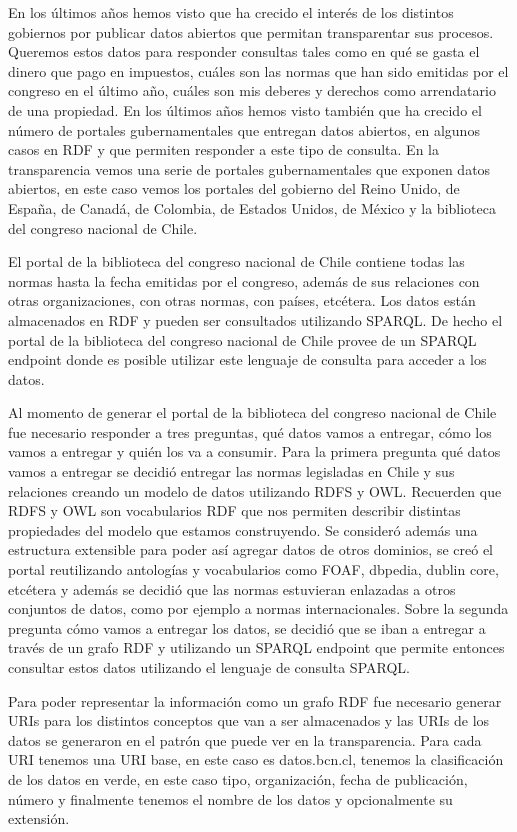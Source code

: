 En los últimos años hemos visto que ha crecido el interés de los distintos gobiernos por publicar datos abiertos que permitan transparentar sus procesos. Queremos estos datos para responder consultas tales como en qué se gasta el dinero que pago en impuestos, cuáles son las normas que han sido emitidas por el congreso en el último año, cuáles son mis deberes y derechos como arrendatario de una propiedad. En los últimos años hemos visto también que ha crecido el número de portales gubernamentales que entregan datos abiertos, en algunos casos en RDF y que permiten responder a este tipo de consulta. En la transparencia vemos una serie de portales gubernamentales que exponen datos abiertos, en este caso vemos los portales del gobierno del Reino Unido, de España, de Canadá, de Colombia, de Estados Unidos, de México y la biblioteca del congreso nacional de Chile.

El portal de la biblioteca del congreso nacional de Chile contiene todas las normas hasta la fecha emitidas por el congreso, además de sus relaciones con otras organizaciones, con otras normas, con países, etcétera. Los datos están almacenados en RDF y pueden ser consultados utilizando SPARQL. De hecho el portal de la biblioteca del congreso nacional de Chile provee de un SPARQL endpoint donde es posible utilizar este lenguaje de consulta para acceder a los datos.

Al momento de generar el portal de la biblioteca del congreso nacional de Chile fue necesario responder a tres preguntas, qué datos vamos a entregar, cómo los vamos a entregar y quién los va a consumir. Para la primera pregunta qué datos vamos a entregar se decidió entregar las normas legisladas en Chile y sus relaciones creando un modelo de datos utilizando RDFS y OWL. Recuerden que RDFS y OWL son vocabularios RDF que nos permiten describir distintas propiedades del modelo que estamos construyendo. Se consideró además una estructura extensible para poder así agregar datos de otros dominios, se creó el portal reutilizando antologías y vocabularios como FOAF, dbpedia, dublin core, etcétera y además se decidió que las normas estuvieran enlazadas a otros conjuntos de datos, como por ejemplo a normas internacionales. Sobre la segunda pregunta cómo vamos a entregar los datos, se decidió que se iban a entregar a través de un grafo RDF y utilizando un SPARQL endpoint que permite entonces consultar estos datos utilizando el lenguaje de consulta SPARQL.

Para poder representar la información como un grafo RDF fue necesario generar URIs para los distintos conceptos que van a ser almacenados y las URIs de los datos se generaron en el patrón que puede ver en la transparencia. Para cada URI tenemos una URI base, en este caso es datos.bcn.cl, tenemos la clasificación de los datos en verde, en este caso tipo, organización, fecha de publicación, número y finalmente tenemos el nombre de los datos y opcionalmente su extensión.

